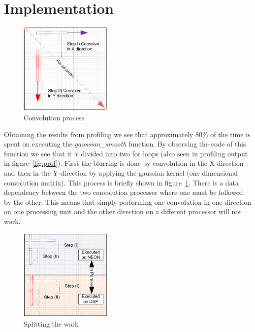 \section{Implementation}
\label{sec:Implementation}
\begin{figure}
\centering
\includegraphics[width=0.4\textwidth]{drawings/gaussian_general}
\caption{Convolution process}
\label{fig:convolution}
\end{figure}

Obtaining the results from profiling we see that approximately 80\% of the time is spent on executing the \textit{gaussian\_smooth} function. By observing the code of this function we see that it is divided into two for loops (also seen in profiling output in figure~\ref{fig:prof}).
First the blurring is done by convolution in the X-direction and then in the Y-direction by applying the gaussian kernel (one dimensional convolution matrix). This process is briefly shown in figure~\ref{fig:convolution}. There is a data dependency between the two convolution processes where one must be followed by the other. This means that simply performing one convolution in one direction on one processing unit and the other direction on a different processor will not work.


\begin{figure}
\centering
\includegraphics[width=0.4\textwidth]{drawings/gaussian_balancing}
\caption{Splitting the work}
\label{fig:balancing}
\end{figure}


